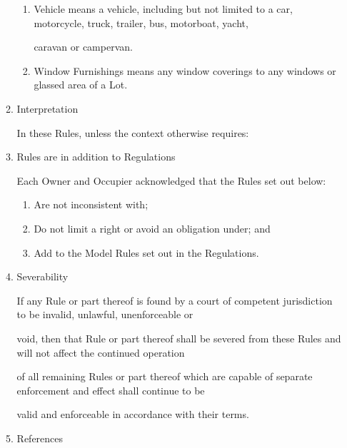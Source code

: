 \documentclass{article}
\begin{document}
\begin{enumerate}[label=\arabic*.]
\begin{enumerate}[label=\arabic{enumi}.\arabic*.]
\begin{enumerate}[label=(\arabic*)]
\item {\fontsize{9.962}{1} Vehicle means a vehicle, including but not limited to a car, motorcycle, truck, trailer, bus, motorboat, yacht, }

{\fontsize{10.02}{1}caravan or campervan. }

\item {\fontsize{9.962}{1} Window Furnishings means any window coverings to any windows or glassed area of a Lot. }

\end{enumerate}
\item {\fontsize{9.99}{1} Interpretation }

{\fontsize{10.02}{1}In these Rules, unless the context otherwise requires: }

\item {\fontsize{9.99}{1} Rules are in addition to Regulations }

{\fontsize{10.02}{1}Each Owner and Occupier acknowledged that the Rules set out below: }

\newpage

\begin{enumerate}[label=(\arabic*)]
\item {\fontsize{9.962}{1} Are not inconsistent with; }

\item {\fontsize{9.962}{1} Do not limit a right or avoid an obligation under; and }

\item {\fontsize{9.962}{1} Add to the Model Rules set out in the Regulations. }

\end{enumerate}
\item {\fontsize{9.99}{1} Severability }

{\fontsize{10.02}{1}If any Rule or part thereof is found by a court of competent jurisdiction to be invalid, unlawful, unenforceable or }

{\fontsize{10.02}{1}void, then that Rule or part thereof shall be severed from these Rules and will not affect the continued operation }

{\fontsize{10.02}{1}of all remaining Rules or part thereof which are capable of separate enforcement and effect shall continue to be }

{\fontsize{10.02}{1}valid and enforceable in accordance with their terms. }

\item {\fontsize{9.99}{1} References }


\end{enumerate}
\end{enumerate}
\end{document}
